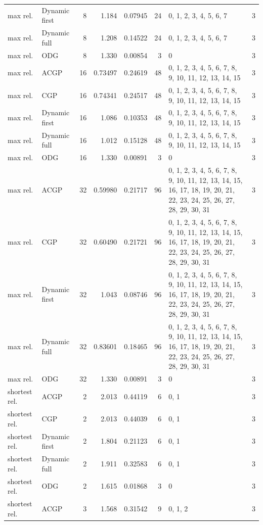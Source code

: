 \documentclass[10pt,a4paper]{article}
\begin{document}
\begin{longtable}{@{}p{23mm}p{29mm}rrrrp{36mm}r@{}}
max rel. & Dynamic first & 8 & 1.184 & 0.07945 & 24 & 0, 1, 2, 3, 4, 5, 6, 7 & 3 \\
max rel. & Dynamic full & 8 & 1.208 & 0.14522 & 24 & 0, 1, 2, 3, 4, 5, 6, 7 & 3 \\
max rel. & ODG & 8 & 1.330 & 0.00854 & 3 & 0 & 3 \\
max rel. & ACGP & 16 & 0.73497 & 0.24619 & 48 & 0, 1, 2, 3, 4, 5, 6, 7, 8, 9, 10, 11, 12, 13, 14, 15 & 3 \\
max rel. & CGP & 16 & 0.74341 & 0.24517 & 48 & 0, 1, 2, 3, 4, 5, 6, 7, 8, 9, 10, 11, 12, 13, 14, 15 & 3 \\
max rel. & Dynamic first & 16 & 1.086 & 0.10353 & 48 & 0, 1, 2, 3, 4, 5, 6, 7, 8, 9, 10, 11, 12, 13, 14, 15 & 3 \\
max rel. & Dynamic full & 16 & 1.012 & 0.15128 & 48 & 0, 1, 2, 3, 4, 5, 6, 7, 8, 9, 10, 11, 12, 13, 14, 15 & 3 \\
max rel. & ODG & 16 & 1.330 & 0.00891 & 3 & 0 & 3 \\
max rel. & ACGP & 32 & 0.59980 & 0.21717 & 96 & 0, 1, 2, 3, 4, 5, 6, 7, 8, 9, 10, 11, 12, 13, 14, 15, 16, 17, 18, 19, 20, 21, 22, 23, 24, 25, 26, 27, 28, 29, 30, 31 & 3 \\
max rel. & CGP & 32 & 0.60490 & 0.21721 & 96 & 0, 1, 2, 3, 4, 5, 6, 7, 8, 9, 10, 11, 12, 13, 14, 15, 16, 17, 18, 19, 20, 21, 22, 23, 24, 25, 26, 27, 28, 29, 30, 31 & 3 \\
max rel. & Dynamic first & 32 & 1.043 & 0.08746 & 96 & 0, 1, 2, 3, 4, 5, 6, 7, 8, 9, 10, 11, 12, 13, 14, 15, 16, 17, 18, 19, 20, 21, 22, 23, 24, 25, 26, 27, 28, 29, 30, 31 & 3 \\
max rel. & Dynamic full & 32 & 0.83601 & 0.18465 & 96 & 0, 1, 2, 3, 4, 5, 6, 7, 8, 9, 10, 11, 12, 13, 14, 15, 16, 17, 18, 19, 20, 21, 22, 23, 24, 25, 26, 27, 28, 29, 30, 31 & 3 \\
max rel. & ODG & 32 & 1.330 & 0.00891 & 3 & 0 & 3 \\
shortest rel. & ACGP & 2 & 2.013 & 0.44119 & 6 & 0, 1 & 3 \\
shortest rel. & CGP & 2 & 2.013 & 0.44039 & 6 & 0, 1 & 3 \\
shortest rel. & Dynamic first & 2 & 1.804 & 0.21123 & 6 & 0, 1 & 3 \\
shortest rel. & Dynamic full & 2 & 1.911 & 0.32583 & 6 & 0, 1 & 3 \\
shortest rel. & ODG & 2 & 1.615 & 0.01868 & 3 & 0 & 3 \\
shortest rel. & ACGP & 3 & 1.568 & 0.31542 & 9 & 0, 1, 2 & 3 \\

\end{longtable}
\end{document}
